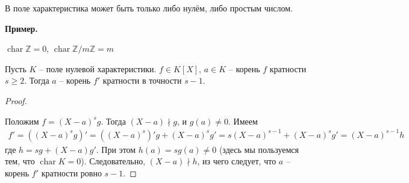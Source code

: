 \begin{normalsize}
\notice В поле характеристика может быть только либо нулём, либо
простым числом.

\textbf{Пример.}

$\operatorname{char} \mathbb{Z} = 0$,
$\operatorname{char} \mathbb{Z}/m\mathbb{Z} = m$

\begin{theorem-non}
    Пусть $K$ -- поле нулевой характеристики. $f \in K[X]$, $a \in K$
    -- корень $f$ кратности $s \geqslant 2$. Тогда $a$ -- корень $f'$
    кратности в точности $s - 1$.
\end{theorem-non}
\begin{proof} $ $

    Положим $f = (X - a)^s g$. Тогда $(X - a) \nmid g$, и $g(a) \neq 0$.
    Имеем
    \begin{gather*}
        f' = \left( (X - a)^s g \right)' = \left( (X - a)^s \right)' g
        + (X - a)^s g' = s(X - a)^{s - 1} + (X - a)^s g' =
        (X - a)^{s - 1} h
    \end{gather*}
    где $h = sg + (X - a)g'$. При этом $h(a) = sg(a) \neq 0$ (здесь
    мы пользуемся тем, что $\operatorname{char} K = 0$). Следовательно,
    $(X - a) \nmid h$, из чего следует, что $a$ -- корень $f'$ кратности
    ровно $s - 1$.

\end{proof}

\end{normalsize}